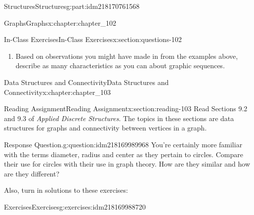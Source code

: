 \documentclass[oneside,10pt,]{book}
\numberwithin{equation}{section}
\begin{document}
\begin{partptx}{Structures}{}{Structures}{}{}{g:part:idm218170761568}
\begin{chapterptx}{Graphs}{}{Graphs}{}{}{x:chapter:chapter_102}
\begin{sectionptx}{In-Class Exercises}{}{In-Class Exercises}{}{}{x:section:questions-102}
\begin{enumerate}[label=\arabic*.]
\begin{enumerate}[label=(\alph*)]
\begin{enumerate}[label=\roman*]
\item{}\(\displaystyle (5,1,1,1,1,1)\)%
\item{}\(\displaystyle (3,3,3,3)\)%
\item{}\(\displaystyle (3,3,3,3,3)\)%
\item{}\(\displaystyle (4,3,2,1,0)\)%
\item{}\(\displaystyle (2,2,2,1,1)\)%
\item{}\(\displaystyle (3,2,2,2,1)\)%
\end{enumerate}
%
\item{}Based on observations you might have made in from the examples above, describe as many characteristics as you can about graphic sequences.%
\end{enumerate}
%
\end{enumerate}
%
\end{sectionptx}
\end{chapterptx}
%
\typeout{************************************************}
\typeout{************************************************}
%
\begin{chapterptx}{Data Structures and Connectivity}{}{Data Structures and Connectivity}{}{}{x:chapter:chapter_103}
\index{}%
%
%
\typeout{************************************************}
\typeout{************************************************}
%
\begin{sectionptx}{Reading Assignment}{}{Reading Assignment}{}{}{x:section:reading-103}
Read Sections 9.2 and 9.3 of \emph{Applied Discrete Structures}. The topics in these sections are data structures for graphs and connectivity between vertices in a graph.%
\begin{question}{Response Question.}{g:question:idm218169989968}%
You're certainly more familiar with the terms diameter, radius and center as they pertain to circles.  Compare their use for circles with their use in graph theory.   How are they similar and how are they different?%
\end{question}
Also, turn in solutions to these exercises:%
%
%
\typeout{************************************************}
\typeout{************************************************}
%
\begin{exercises-subsection-numberless}{Exercises}{}{Exercises}{}{}{g:exercises:idm218169988720}
\par\medskip\noindent%

\end{exercises-subsection-numberless}
\end{sectionptx}
\end{chapterptx}
\end{partptx}
\end{document}
